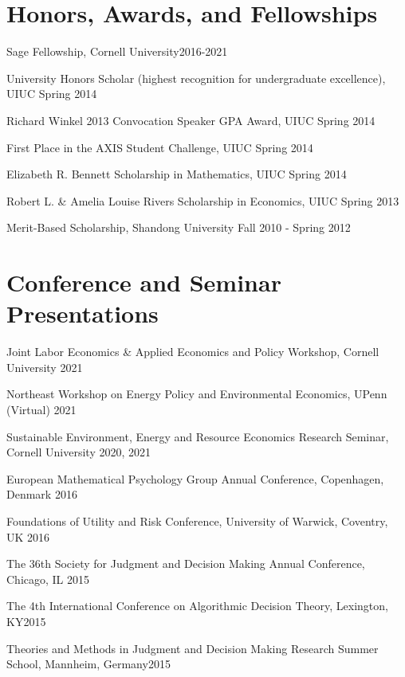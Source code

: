\documentclass[letterpaper]{article}
\renewenvironment{itemize}{
  \begin{list}{}{
    \setlength{\leftmargin}{0.35em}
  }
}{
  \end{list}
}
\begin{document}
\section*{Honors, Awards, and Fellowships}
\begin{itemize}
\item Sage Fellowship, Cornell University\hfill 2016-2021
\item University Honors Scholar (highest recognition for undergraduate excellence), UIUC \hfill Spring 2014
\item Richard Winkel 2013 Convocation Speaker GPA Award, UIUC \hfill Spring 2014
\item First Place in the AXIS Student Challenge, UIUC \hfill Spring 2014
\item Elizabeth R. Bennett Scholarship in Mathematics, UIUC \hfill Spring 2014
\item Robert L. \& Amelia Louise Rivers Scholarship in Economics, UIUC \hfill Spring 2013
\item Merit-Based Scholarship, Shandong University \hfill Fall 2010 - Spring 2012
\end{itemize}
\section*{Conference and Seminar Presentations}
\begin{itemize}
\item Joint Labor Economics \& Applied Economics and Policy Workshop, Cornell University \hfill 2021
\item Northeast Workshop on Energy Policy and Environmental Economics, UPenn (Virtual) \hfill 2021
\item Sustainable Environment, Energy and Resource Economics Research Seminar, Cornell University \hfill 2020, 2021
\item European Mathematical Psychology Group Annual Conference, Copenhagen, Denmark \hfill 2016
\item Foundations of Utility and Risk Conference, University of Warwick, Coventry, UK \hfill 2016
\item The 36th Society for Judgment and Decision Making Annual Conference, Chicago, IL \hfill 2015
\item The 4th International Conference on Algorithmic Decision Theory, Lexington, KY\hfill 2015
\item Theories and Methods in Judgment and Decision Making Research Summer School, Mannheim, Germany\hfill2015
\end{itemize}
\end{document}
